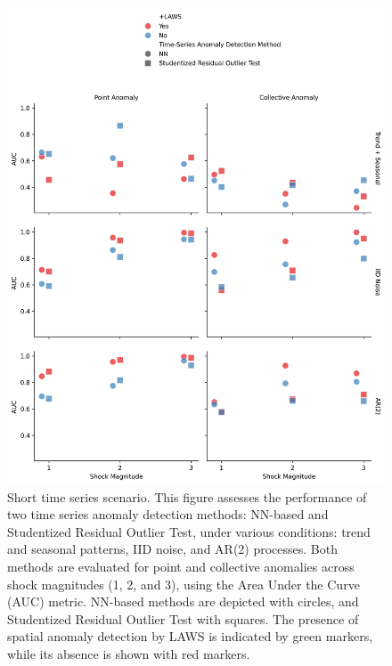 \documentclass[11pt]{article}
\begin{document}
\begin{figure}[h]
    \centering
    \includegraphics[width=\textwidth]{../figure/simulation_short_time_series.png}
    \caption{Short time series scenario. This figure assesses the performance of two time series anomaly detection methods: NN-based and Studentized Residual Outlier Test, under various conditions: trend and seasonal patterns, IID noise, and AR(2) processes. Both methods are evaluated for point and collective anomalies across shock magnitudes (1, 2, and 3), using the Area Under the Curve (AUC) metric. NN-based methods are depicted with circles, and Studentized Residual Outlier Test with squares. The presence of spatial anomaly detection by LAWS is indicated by green markers, while its absence is shown with red markers.}
    \label{fig: simulation short time series}
\end{figure}
\end{document}
